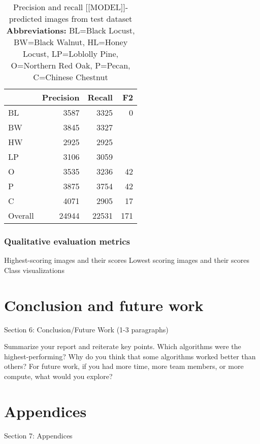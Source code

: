 \documentclass[10pt,twocolumn,letterpaper]{article}
\begin{document}
  \begin{table}[!htbp]
    \begin{center}
      \small
    \begin{tabular}{|l|r|r|r|}
    \hline
    & Precision & Recall & F2\\
    \hline\hline
    BL& 3587 & 3325 & 0 \\
     BW & 3845 & 3327 & \\
     HW & 2925 & 2925 &\\
     LP & 3106 & 3059 & \\
     O & 3535 & 3236 & 42 \\
     P & 3875 & 3754 & 42 \\
     C & 4071 & 2905 & 17 \\
    \hline
    \hline\hline
   Overall & 24944 & 22531 & 171 \\
   \hline
    \end{tabular}
    \end{center}
    \caption{\label{tab:recall} Precision and recall [[MODEL]]-predicted images from test dataset \textbf{Abbreviations:} BL=Black Locust, BW=Black Walnut, HL=Honey Locust, LP=Loblolly Pine, O=Northern Red Oak, P=Pecan, C=Chinese Chestnut}
    \end{table}

\subsubsection{Qualitative evaluation metrics}
Highest-scoring images and their scores
Lowest scoring images and their scores
Class visualizations







\section{Conclusion and future work}
\label{sec:conclusion}
Section 6: Conclusion/Future Work (1-3 paragraphs)

Summarize your report and reiterate key points. Which algorithms were the highest-performing? Why do you think that some algorithms worked better than others? For future work, if you had more time, more team members, or more compute, what would you explore?

\section{Appendices}
\label{sec:appendix}
Section 7: Appendices
\end{document}
